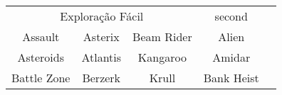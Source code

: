 \begin{tabular}{cc|c||c|c}
\multicolumn{3}{c||}{Exploração Fácil}                      & second \\
Assault     & Asterix                    & Beam Rider                & Alien                    \\
Asteroids   & Atlantis                   & Kangaroo                  & Amidar                   \\
Battle Zone & Berzerk                    & Krull                     & Bank Heist               \\
\end{tabular}
